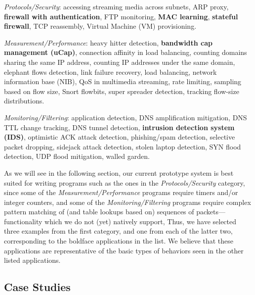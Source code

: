 \documentclass[pldi-cameraready]{sigplanconf}
\begin{document}
\begin{compactitem}
\item {\em Protocols/Security}:
accessing streaming media across subnets, ARP proxy, {\bf firewall with authentication}, FTP monitoring, {\bf MAC learning}, {\bf stateful firewall}, TCP reassembly, Virtual Machine (VM) provisioning.
\item {\em Measurement/Performance}:
heavy hitter detection, {\bf bandwidth cap management (uCap)}, connection affinity in load balancing, counting domains sharing the same IP address, counting IP addresses under the same domain, elephant flows detection, link failure recovery, load balancing, network information base (NIB), QoS in multimedia streaming, rate limiting, sampling based on flow size, Snort flowbits, super spreader detection, tracking flow-size distributions.
\item {\em Monitoring/Filtering}:
application detection, DNS amplification mitigation, DNS TTL change tracking, DNS tunnel detection, {\bf intrusion detection system (IDS)}, optimistic ACK attack detection, phishing/spam detection, selective packet dropping, sidejack attack detection, stolen laptop detection, SYN flood detection, UDP flood mitigation, walled garden.
\end{compactitem}

\noindent
As we will see in the following section, our current prototype system is best suited for writing
programs such as the ones in the {\em Protocols/Security} category, since
some of the {\em Measurement/Performance}
programs require timers and/or integer counters,
and some of the {\em Monitoring/Filtering} programs require complex pattern matching of
(and table lookups based on)
sequences of packets---functionality which we do not (yet) natively support,
Thus, we have selected three examples from the first category, and one from each of the
latter two, corresponding to the boldface applications in the list.
We believe that these applications are representative of the basic types of behaviors seen in
the other listed applications.

\subsection{Case Studies}
\label{subsec:case}
\end{document}
